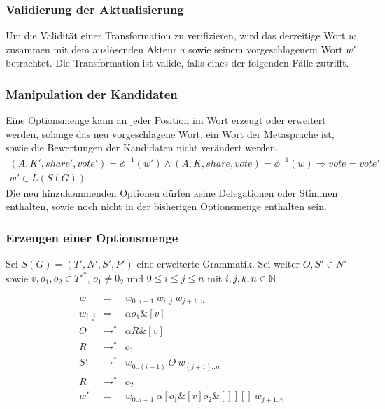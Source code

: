 \documentclass[a4paper,12pt]{report}
\begin{document}
\subsubsection*{Validierung der Aktualisierung}
Um die Validität einer Transformation zu verifizieren, wird das derzeitige Wort $w$ zusammen mit dem auslösenden Akteur $a$ sowie seinem vorgeschlagenem Wort $w'$ betrachtet. Die Transformation ist valide, falls eines der folgenden Fälle zutrifft.

% 
% 
% 
% 




\subsubsection*{Manipulation der Kandidaten}
Eine Optionsmenge kann an jeder Position im Wort erzeugt oder erweitert werden, solange das neu vorgeschlagene Wort, ein Wort der Metasprache ist, sowie die Bewertungen der Kandidaten nicht verändert werden.
\begin{eqnarray}
(A,K',share',vote') = \phi^{-1}(w') \land (A,K,share,vote) = \phi^{-1}(w) \Rightarrow vote = vote' \\
  w'\in L(S(G))
\end{eqnarray}
Die neu hinzukommenden Optionen dürfen keine Delegationen oder Stimmen enthalten, sowie noch nicht in der bisherigen Optionsmenge enthalten sein.

\subsubsection*{Erzeugen einer Optionsmenge}

Sei $S(G) = (T', N', S', P')$ eine erweiterte Grammatik. Sei weiter $O,S'\in N'$ sowie $v,o_1,o_2 \in T'^*$, $o_1\neq 0_2$ und $0\leq i\leq j\leq n$ mit $i,j,k,n \in \mathbb{N}$

\begin{eqnarray}
  w &=& w_{0 .. i-1}\ w_{i..j}\ w_{j+1 .. n} \\
  w_{i..j} &=& \alpha o_1 \& [v] \\
  O &\rightarrow^*& \alpha R \& [v] \\
  R &\rightarrow^*& o_1 \\
  S' &\rightarrow^*& w_{0 .. (i-1)}\ O\ w_{(j+1) .. n}\\
  R &\rightarrow^*& o_2 \\
  w' &=& w_{0..i-1}\ \alpha [o_1\& [v] o_2\& []][]\ w_{j+1 .. n}
\end{eqnarray}
\end{document}
